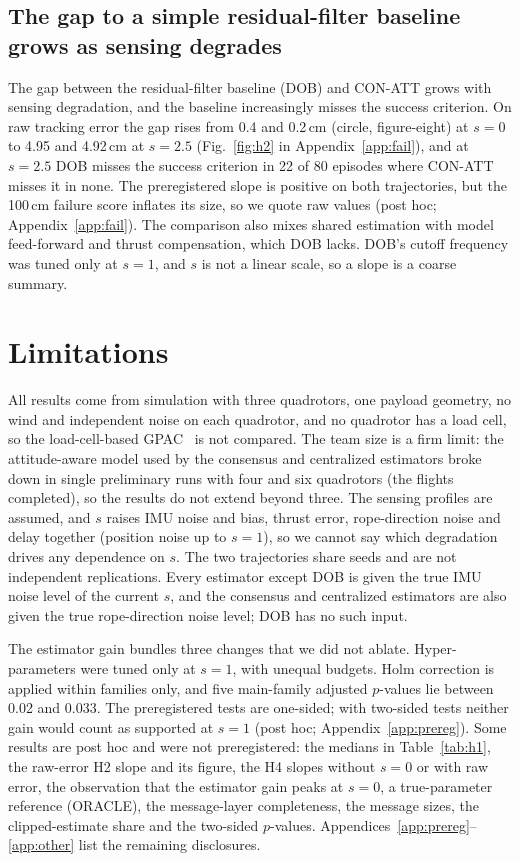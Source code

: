 \documentclass[conference]{IEEEtran}
\begin{document}
\subsection{The gap to a simple residual-filter baseline grows as sensing degrades}
The gap between the residual-filter baseline (DOB) and CON-ATT grows with sensing degradation, and the baseline increasingly misses the success criterion. On raw tracking error the gap rises from 0.4 and 0.2\,cm (circle, figure-eight) at $s=0$ to 4.95 and 4.92\,cm at $s=2.5$ (Fig.~\ref{fig:h2} in Appendix~\ref{app:fail}), and at $s=2.5$ DOB misses the success criterion in 22 of 80 episodes where CON-ATT misses it in none. The preregistered slope is positive on both trajectories, but the 100\,cm failure score inflates its size, so we quote raw values (post hoc; Appendix~\ref{app:fail}). The comparison also mixes shared estimation with model feed-forward and thrust compensation, which DOB lacks. DOB's cutoff frequency was tuned only at $s{=}1$, and $s$ is not a linear scale, so a slope is a coarse summary.

\section{Limitations}
All results come from simulation with three quadrotors, one payload geometry, no wind and independent noise on each quadrotor, and no quadrotor has a load cell, so the load-cell-based GPAC~\cite{gpac2026} is not compared. The team size is a firm limit: the attitude-aware model used by the consensus and centralized estimators broke down in single preliminary runs with four and six quadrotors (the flights completed), so the results do not extend beyond three. The sensing profiles are assumed, and $s$ raises IMU noise and bias, thrust error, rope-direction noise and delay together (position noise up to $s{=}1$), so we cannot say which degradation drives any dependence on $s$. The two trajectories share seeds and are not independent replications. Every estimator except DOB is given the true IMU noise level of the current $s$, and the consensus and centralized estimators are also given the true rope-direction noise level; DOB has no such input.

The estimator gain bundles three changes that we did not ablate. Hyper-parameters were tuned only at $s{=}1$, with unequal budgets. Holm correction is applied within families only, and five main-family adjusted $p$-values lie between 0.02 and 0.033. The preregistered tests are one-sided; with two-sided tests neither gain would count as supported at $s{=}1$ (post hoc; Appendix~\ref{app:prereg}). Some results are post hoc and were not preregistered: the medians in Table~\ref{tab:h1}, the raw-error H2 slope and its figure, the H4 slopes without $s{=}0$ or with raw error, the observation that the estimator gain peaks at $s{=}0$, a true-parameter reference (ORACLE), the message-layer completeness, the message sizes, the clipped-estimate share and the two-sided $p$-values. Appendices~\ref{app:prereg}--\ref{app:other} list the remaining disclosures.
\end{document}
